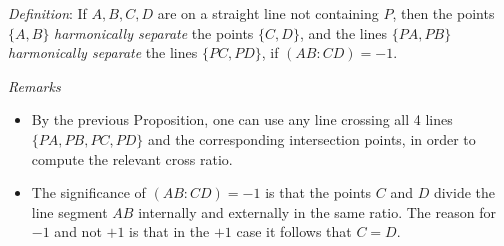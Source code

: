 \documentclass[11pt,a4paper]{report}
\theoremstyle{plain}
\theoremstyle{definition}
\begin{document}
\medskip
\noindent  \emph{Definition}: \quad  If $ A, B, C, D $ are on a straight line not containing $ P $, then the points $ \{ A, B \} $ \emph{harmonically separate}  the points $ \{C,D \} $, and the lines $ \{PA, PB\} $ \emph{harmonically separate} the lines $ \{ PC, PD \} $,  if $ (AB:CD) = -1 $.

\medskip
\noindent \emph{Remarks}
\begin{itemize}[nosep]  
\item By the previous Proposition, one can use any line crossing all 4 lines $ \{PA, PB,  PC, PD \} $ and the corresponding intersection points, in order to compute the relevant cross ratio.
\item The significance of $ (AB:CD) = -1 $ is that the points $ C $ and $ D $ divide the line segment $ AB $ internally and externally in the same ratio.  The reason for $ -1 $ and not $ +1 $ is that in the $ +1 $  case it follows that $ C= D $. 
\end{itemize} 

\bigskip
\bigskip
\end{document}
